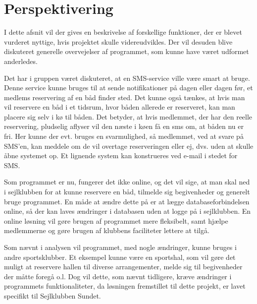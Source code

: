 \chapter{Perspektivering}

I dette afsnit vil der gives en beskrivelse af forskellige funktioner, der er blevet vurderet nyttige, hvis projektet skulle videreudvikles. 
Der vil desuden blive diskuteret generelle overvejelser af programmet, som kunne have været udformet anderledes. 

Det har i gruppen været diskuteret, at en SMS-service ville være smart at bruge. 
Denne service kunne bruges til at sende notifikationer på dagen eller dagen før, et medlems reservering af en båd finder sted. 
Det kunne også tænkes, at hvis man vil reservere en båd i et tidsrum, hvor båden allerede er reserveret, kan man placere sig selv i kø til båden.
Det betyder, at hvis medlemmet, der har den reelle reservering, pludselig aflyser vil den næste i køen få en sms om, at båden nu er fri.
Her kunne der evt. bruges en svarmulighed, så medlemmet, ved at svare på SMS'en, kan meddele om de vil overtage reserveringen eller ej, dvs. uden at skulle åbne systemet op.
Et lignende system kan konstrueres ved e-mail i stedet for SMS.

Som programmet er nu, fungerer det ikke online, og det vil sige, at man skal ned i sejlklubben for at kunne reservere en båd, tilmelde sig begivenheder og generelt bruge programmet. 
En måde at ændre dette på er at lægge databaseforbindelsen online, så der kan laves ændringer i databasen uden at logge på i sejlklubben. 
En online løsning vil gøre brugen af programmet mere fleksibelt, samt hjælpe medlemmerne og gøre brugen af klubbens faciliteter lettere at tilgå.

Som nævnt i analysen vil programmet, med nogle ændringer, kunne bruges i andre sportsklubber. 
Et eksempel kunne være en sportshal, som vil gøre det muligt at reservere hallen til diverse arrangementer, melde sig til begivenheder der måtte foregå o.l. 
Dog vil dette, som nævnt tidligere, kræve ændringer i programmets funktionaliteter, da løsningen fremstillet til dette projekt, er lavet specifikt til Sejlklubben Sundet.


